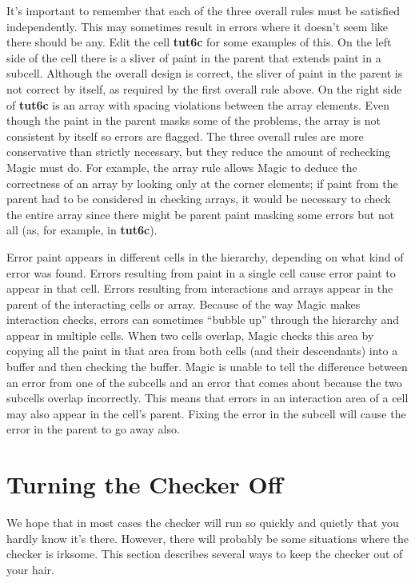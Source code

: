 \documentclass[letterpaper,twoside,12pt]{article}
\begin{document}
It's important to remember that each of the three overall rules
must be satisfied independently.  This may sometimes result in
errors where it doesn't seem like there should be any.  Edit
the cell {\bfseries tut6c} for some examples of this.  On the
left side of the cell there is a sliver of paint in the parent
that extends paint in a subcell.  Although the
overall design is correct, the sliver of paint in the parent
is not correct by itself, as required by the first overall
rule above.  On the right side of {\bfseries tut6c} is an array
with spacing violations between the array elements.  Even though the
paint in the parent masks some of the problems,
the array is not consistent by itself so errors
are flagged.  The three overall rules are more conservative
than strictly necessary, but
they reduce the amount of rechecking Magic must do.  For example,
the array rule allows Magic to deduce the correctness of an
array by looking only at the corner elements;  if paint from the
parent had to be considered in checking arrays, it would be necessary
to check the entire array since there might be parent paint masking
some errors but not all (as, for example, in {\bfseries tut6c}).

Error paint appears in different cells in the hierarchy, depending
on what kind of error was found.  Errors resulting from paint in
a single cell cause error paint to appear
in that cell.  Errors resulting from interactions and arrays appear
in the parent of the interacting cells or array.  Because of the
way Magic makes interaction checks, errors can sometimes ``bubble
up'' through the hierarchy and appear in multiple cells.  When
two cells overlap, Magic checks this area by copying all the paint
in that area from both cells (and their descendants) into a buffer
and then checking the buffer.  Magic is unable to tell the difference
between an error from one of the subcells and an error that comes
about because the two subcells overlap incorrectly.  This means that
errors in an interaction area of a cell may also appear in the
cell's parent.  Fixing the error in the subcell will cause the error
in the parent to go away also.

\section{Turning the Checker Off}

We hope that in most cases the checker will run so quickly and
quietly that you hardly know it's there.  However, there will
probably be some situations where the checker is irksome.  This
section describes several ways to keep the checker out of your
hair.
\end{document}
